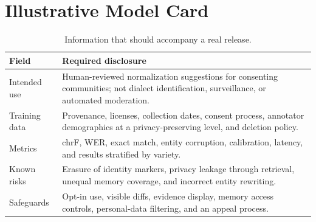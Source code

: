 \section{Illustrative Model Card}
\label{app:model-card}

\begin{table}[h]
  \centering
  \caption{Information that should accompany a real release.}
  \label{tab:model-card}
  \small
  \begin{tabular}{p{}p{}}
    \toprule
    Field & Required disclosure \\
    \midrule
    Intended use & Human-reviewed normalization suggestions for consenting
      communities; not dialect identification, surveillance, or automated
      moderation. \\
    Training data & Provenance, licenses, collection dates, consent process,
      annotator demographics at a privacy-preserving level, and deletion
      policy. \\
    Metrics & chrF, WER, exact match, entity corruption, calibration, latency,
      and results stratified by variety. \\
    Known risks & Erasure of identity markers, privacy leakage through
      retrieval, unequal memory coverage, and incorrect entity rewriting. \\
    Safeguards & Opt-in use, visible diffs, evidence display, memory access
      controls, personal-data filtering, and an appeal process. \\
    \bottomrule
  \end{tabular}
\end{table}
